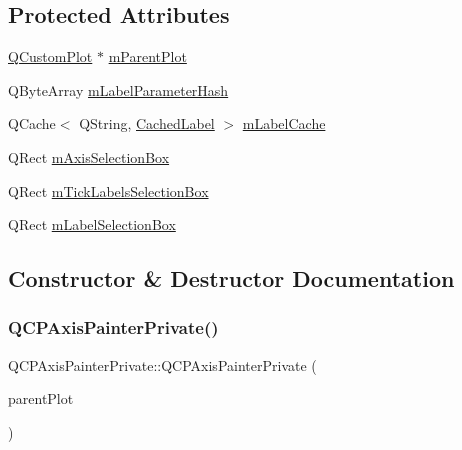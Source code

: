 \subsection*{Protected Attributes}
\begin{DoxyCompactItemize}
\item 
\mbox{\hyperlink{class_q_custom_plot}{Q\+Custom\+Plot}} $\ast$ \mbox{\hyperlink{class_q_c_p_axis_painter_private_a882029a5f2d4abd71289d415c9b90a28}{m\+Parent\+Plot}}
\item 
Q\+Byte\+Array \mbox{\hyperlink{class_q_c_p_axis_painter_private_aab8be59df22ed4e43e3a6d511cbc466a}{m\+Label\+Parameter\+Hash}}
\item 
Q\+Cache$<$ Q\+String, \mbox{\hyperlink{struct_q_c_p_axis_painter_private_1_1_cached_label}{Cached\+Label}} $>$ \mbox{\hyperlink{class_q_c_p_axis_painter_private_a07ac270ea0c0ae084debd48d6a740e35}{m\+Label\+Cache}}
\item 
Q\+Rect \mbox{\hyperlink{class_q_c_p_axis_painter_private_a9d7586f4923994488bdd006415b13f5f}{m\+Axis\+Selection\+Box}}
\item 
Q\+Rect \mbox{\hyperlink{class_q_c_p_axis_painter_private_a0adaf5f1d89be0f32dc4a904d157e5a9}{m\+Tick\+Labels\+Selection\+Box}}
\item 
Q\+Rect \mbox{\hyperlink{class_q_c_p_axis_painter_private_abac9a47048d537f72ca147b6f29d30f1}{m\+Label\+Selection\+Box}}
\end{DoxyCompactItemize}


\subsection{Constructor \& Destructor Documentation}
\mbox{\label{class_q_c_p_axis_painter_private_a0f14aa5c4aa83dbcd68984a7c73bf94f}} 
\subsubsection{\texorpdfstring{QCPAxisPainterPrivate()}{QCPAxisPainterPrivate()}}
{\footnotesize\ttfamily Q\+C\+P\+Axis\+Painter\+Private\+::\+Q\+C\+P\+Axis\+Painter\+Private (\begin{DoxyParamCaption}\item[{\mbox{\hyperlink{class_q_custom_plot}{Q\+Custom\+Plot}} $\ast$}]{parent\+Plot }\end{DoxyParamCaption})\hspace{0.3cm}{\ttfamily [explicit]}}

